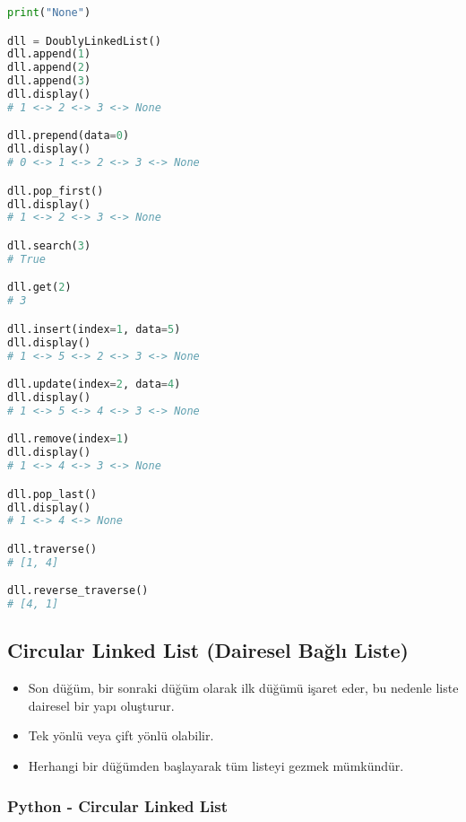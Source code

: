 \begin{lstlisting}[language=Python]
        print("None")

dll = DoublyLinkedList()
dll.append(1)
dll.append(2)
dll.append(3)
dll.display()
# 1 <-> 2 <-> 3 <-> None

dll.prepend(data=0)
dll.display()
# 0 <-> 1 <-> 2 <-> 3 <-> None

dll.pop_first()
dll.display()
# 1 <-> 2 <-> 3 <-> None

dll.search(3)
# True

dll.get(2)
# 3

dll.insert(index=1, data=5)
dll.display()
# 1 <-> 5 <-> 2 <-> 3 <-> None

dll.update(index=2, data=4)
dll.display()
# 1 <-> 5 <-> 4 <-> 3 <-> None

dll.remove(index=1)
dll.display()
# 1 <-> 4 <-> 3 <-> None

dll.pop_last()
dll.display()
# 1 <-> 4 <-> None

dll.traverse()
# [1, 4]

dll.reverse_traverse()
# [4, 1]
\end{lstlisting}

\newpage

\subsection{Circular Linked List (Dairesel Bağlı Liste)}

\begin{itemize}
    \item Son düğüm, bir sonraki düğüm olarak ilk düğümü işaret eder, bu nedenle liste dairesel bir yapı oluşturur.
    \item Tek yönlü veya çift yönlü olabilir.
    \item Herhangi bir düğümden başlayarak tüm listeyi gezmek mümkündür.
\end{itemize}

\subsubsection{Python - Circular Linked List}

